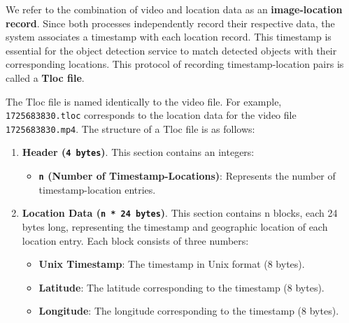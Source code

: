 We refer to the combination of video and location data as an \textbf{image-location record}. Since both processes independently record their respective data, the system associates a timestamp with each location record. This timestamp is essential for the object detection service to match detected objects with their corresponding locations. This protocol of recording timestamp-location pairs is called a \textbf{Tloc file}.

The Tloc file is named identically to the video file. For example, \texttt{1725683830.tloc} corresponds to the location data for the video file \texttt{1725683830.mp4}. The structure of a Tloc file is as follows:
\begin{enumerate}
    \item\textbf{Header (\texttt{4 bytes})}. This section contains an integers:
    \begin{itemize}
        \item \textbf{\texttt{n} (Number of Timestamp-Locations)}: Represents the number of timestamp-location entries.
    \end{itemize}
    
    \item \textbf{Location Data (\texttt{n * 24 bytes})}. This section contains n blocks, each 24 bytes long, representing the timestamp and geographic location of each location entry. Each block consists of three numbers:
    \begin{itemize}
        \item \textbf{Unix Timestamp}: The timestamp in Unix format (8 bytes).
        \item \textbf{Latitude}: The latitude corresponding to the timestamp (8 bytes).
        \item \textbf{Longitude}: The longitude corresponding to the timestamp (8 bytes).
    \end{itemize}


\end{enumerate}
